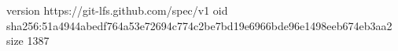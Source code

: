 version https://git-lfs.github.com/spec/v1
oid sha256:51a4944abedf764a53e72694c774c2be7bd19e6966bde96e1498eeb674eb3aa2
size 1387
